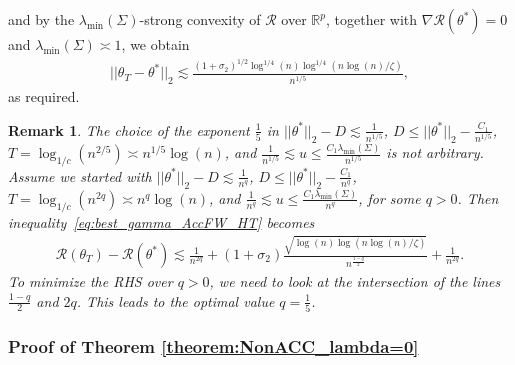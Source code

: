\documentclass{article}
\newtheorem{remark}{\textbf{Remark}}
\begin{document}
and by the $\lambda_{\min}(\Sigma)$-strong convexity of $\mathcal{R}$ over $\mathbb{R}^p$, together with $\nabla\mathcal{R}(\theta^*) = 0$ and $\lambda_{\min}(\Sigma) \asymp 1$, we obtain
\begin{align*}
||\theta_T - \theta^*||_2 \lesssim \frac{(1 + \sigma_2)^{1/2}\log^{1/4}(n)\log^{1/4}\left(n\log(n)/\zeta\right)}{n^{1/5}},
\end{align*}
as required.

\begin{remark}
The choice of the exponent $\frac{1}{5}$ in $||\theta^*||_2 - D \lesssim\frac{1}{n^{1/5}}$, $D \leq ||\theta^*||_2 - \frac{C_1}{n^{1/5}}$, $T = \log_{1/c}(n^{2/5}) \asymp n^{1/5}\log(n)$, and $\frac{1}{n^{1/5}} \lesssim u \leq \frac{C_1\lambda_{\min}(\Sigma)}{n^{1/5}}$ is not arbitrary. Assume we started with $||\theta^*||_2 - D \lesssim \frac{1}{n^{q}}$, $D \leq ||\theta^*||_2 - \frac{C_1}{n^{q}}$, $T = \log_{1/c}(n^{2q}) \asymp n^q\log(n)$, and $\frac{1}{n^{q}} \lesssim u \leq \frac{C_1\lambda_{\min}(\Sigma)}{n^{q}}$, for some $q > 0$. Then inequality~\eqref{eq:best_gamma_AccFW_HT} becomes 
\begin{align*}
\mathcal{R}(\theta_T) - \mathcal{R}(\theta^*) \lesssim \frac{1}{n^{2q}} + (1 + \sigma_2)\frac{\sqrt{\log(n)\log\left(n\log(n)/\zeta\right)}}{n^{\frac{1 - q}{2}}} + \frac{1}{n^{2q}}.
\end{align*}
To minimize the RHS over $q > 0$, we need to look at the intersection of the lines $\frac{1 - q}{2}$ and $2q$. This leads to the optimal value $q = \frac{1}{5}$. 
\end{remark}


\subsubsection{Proof of Theorem \ref{theorem:NonACC_lambda=0}}
\label{ThmNonACC0}
\end{document}

